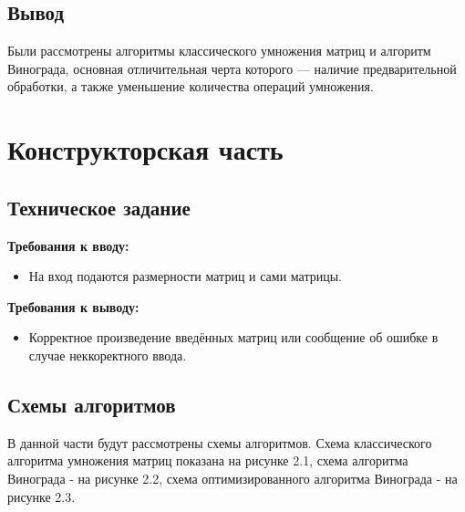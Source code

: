 \documentclass[12pt]{report}
\begin{document}
\section{Вывод}
Были рассмотрены алгоритмы классического умножения матриц и алгоритм Винограда, основная отличительная черта которого — наличие предварительной обработки, а также уменьшение количества операций умножения.


\chapter{Конструкторская часть}
\section{Техническое задание}
\textbf{Требования к вводу:}\\
\begin{itemize}
	\item На вход подаются размерности матриц и сами матрицы.
\end{itemize}

\textbf{Требования к выводу:}\\
\begin{itemize}
	\item Корректное произведение введённых матриц или сообщение об ошибке в случае неккоректного ввода.
\end{itemize}


\section{Схемы алгоритмов}
В данной части будут рассмотрены схемы алгоритмов. Схема классического алгоритма умножения матриц показана на рисунке 2.1, схема алгоритма Винограда - на рисунке 2.2, схема оптимизированного алгоритма Винограда - на рисунке 2.3.
\end{document}
